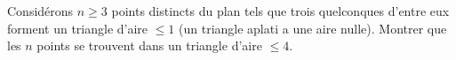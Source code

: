 Considérons $n \geq 3$ points distincts du plan tels que trois quelconques
d'entre eux forment un triangle d'aire $\leq 1$ (un triangle aplati a une
aire nulle). Montrer que les $n$ points se trouvent dans un
triangle d'aire $\leq 4$.
